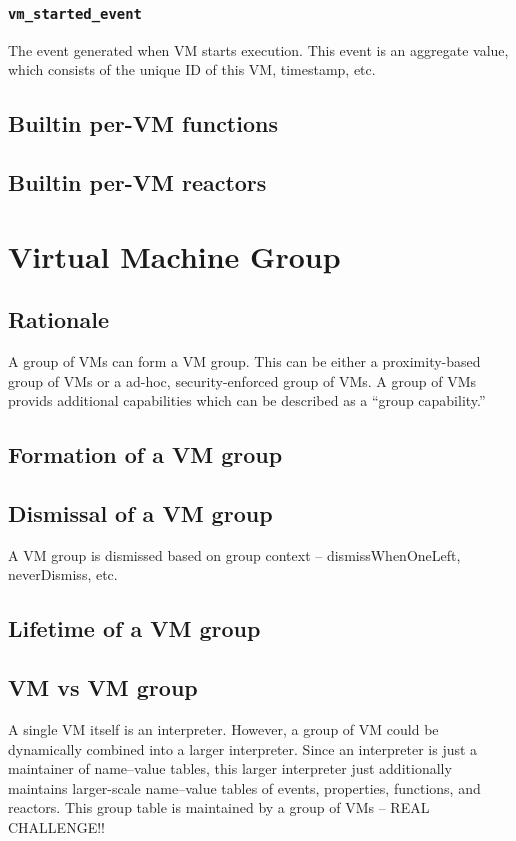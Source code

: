 \documentclass{note}
\begin{document}
\subsubsection{\textcolor{red2}{\texttt{vm\_started\_event}}}
The event generated when VM starts execution.
This event is an aggregate value, which consists of the unique ID
of this VM, timestamp, etc.


\subsection{Builtin per-VM functions}

\subsection{Builtin per-VM reactors}



\section{Virtual Machine Group}
\subsection{Rationale}
A group of VMs can form a VM group. 
This can be either a proximity-based group of VMs or a ad-hoc,
security-enforced group of VMs.
A group of VMs provids additional capabilities which can be described as a 
``group capability.''

\subsection{Formation of a VM group}
\subsection{Dismissal of a VM group}
A VM group is dismissed based on group context -- dismissWhenOneLeft,
neverDismiss, etc.

\subsection{Lifetime of a VM group}

\subsection{VM vs VM group}
A single VM itself is an interpreter. However, a group of VM could be
dynamically combined into a larger interpreter. Since an interpreter is just
a maintainer of name--value tables, this larger interpreter just additionally
maintains larger-scale name--value tables of events, properties, functions,
and reactors. 
This group table is maintained by a group of VMs -- REAL CHALLENGE!!
\end{document}
